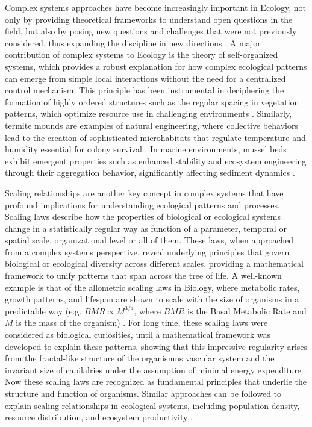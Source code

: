 Complex systems approaches have become increasingly important in Ecology, not
only by providing theoretical frameworks to understand open questions in the
field, but also by posing new questions and challenges that were not previously
considered, thus expanding the discipline in new directions \cite{Milne1998}. A
major contribution of complex systems to Ecology is the theory of
self-organized systems, which provides a robust explanation for how
complex ecological patterns can emerge from simple local interactions without
the need for a centralized control mechanism. This principle has been
instrumental in deciphering the formation of highly ordered structures such as
the regular spacing in vegetation patterns, which optimize resource use in
challenging environments \cite{Tarnita2017}. Similarly, termite mounds are
examples of natural engineering, where collective behaviors lead to the
creation of sophisticated microhabitats that regulate temperature and humidity
essential for colony survival \cite{Heyde2021}. In marine environments, mussel
beds exhibit emergent properties such as enhanced stability and ecosystem
engineering through their aggregation behavior, significantly affecting
sediment dynamics \cite{Koppel2008}.

Scaling relationships are another key concept in complex systems that have
profound implications for understanding ecological patterns and processes.
Scaling laws describe how the properties of biological or ecological systems
change in a statistically regular way as function of a parameter, temporal or
spatial scale, organizational level or all of them. These laws, when approached
from a complex systems perspective, reveal underlying principles that govern
biological or ecological diversity across different scales, providing a
mathematical framework to unify patterns that span across the tree of life. A
well-known example is that of the allometric scaling laws in Biology, where
metabolic rates, growth patterns, and lifespan are shown to scale with the size
of organisms in a predictable way (e.g. $BMR \propto M^{3/4}$, where $BMR$ is
the Basal Metabolic Rate and $M$ is the mass of the organism)
\cite{Peters1983}. For long time, these scaling laws were considered as
biological curiosities, until a mathematical framework was developed to explain
these patterns, showing that this impressive regularity arises from the
fractal-like structure of the organismns vascular system and the invariant size
of capilalries under the assumption of minimal energy expenditure
\cite{West1997}. Now these scaling laws are recognized as fundamental
principles that underlie the structure and function of organisms.
Similar approaches can be followed to explain scaling relationships in
ecological systems, including population density, resource distribution, and
ecosystem productivity \cite{Brown2004}.

